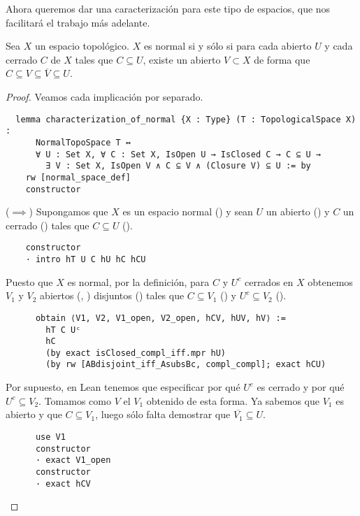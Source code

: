 Ahora queremos dar una caracterización para este tipo de espacios, que nos facilitará el trabajo más adelante.

\begin{proposition}\label{caracterizacion-normal}
  Sea $X$ un espacio topológico. $X$ es normal si y sólo si para cada abierto $U$ y cada cerrado $C$ de $X$ tales que $C \subseteq U$, existe un abierto $V \subset X$ de forma que $C \subseteq V \subseteq \overline{V} \subseteq U$.
\end{proposition}

\begin{proof}
  Veamos cada implicación por separado.

  \begin{lstlisting}
  lemma characterization_of_normal {X : Type} (T : TopologicalSpace X) :
      NormalTopoSpace T ↔
      ∀ U : Set X, ∀ C : Set X, IsOpen U → IsClosed C → C ⊆ U →
        ∃ V : Set X, IsOpen V ∧ C ⊆ V ∧ (Closure V) ⊆ U := by
    rw [normal_space_def]
    constructor \end{lstlisting}

  ($\implies$) Supongamos que $X$ es un espacio normal () y sean $U$ un abierto () y $C$ un cerrado () tales que $C \subseteq U$ ().

  \begin{lstlisting}
    constructor
    · intro hT U C hU hC hCU \end{lstlisting}
  
  Puesto que $X$ es normal, por la definición, para $C$ y $U^c$ cerrados en $X$ obtenemos $V_1$ y $V_2$ abiertos (, ) disjuntos () tales que $C \subseteq V_1$ () y $U^c \subseteq V_2$ ().

  \begin{lstlisting}
      obtain ⟨V1, V2, V1_open, V2_open, hCV, hUV, hV⟩ :=
        hT C Uᶜ
        hC
        (by exact isClosed_compl_iff.mpr hU)
        (by rw [ABdisjoint_iff_AsubsBc, compl_compl]; exact hCU) \end{lstlisting}

  Por supuesto, en Lean tenemos que especificar por qué $U^c$ es cerrado y por qué $U^c \subseteq V_2$.
  Tomamos como $V$ el $V_1$ obtenido de esta forma. Ya sabemos que $V_1$ es abierto y que $C\subseteq V_1$, luego sólo falta demostrar que $\overline{V_1} \subseteq U$.

  \begin{lstlisting}
      use V1
      constructor
      · exact V1_open
      constructor
      · exact hCV \end{lstlisting}


\end{proof}

